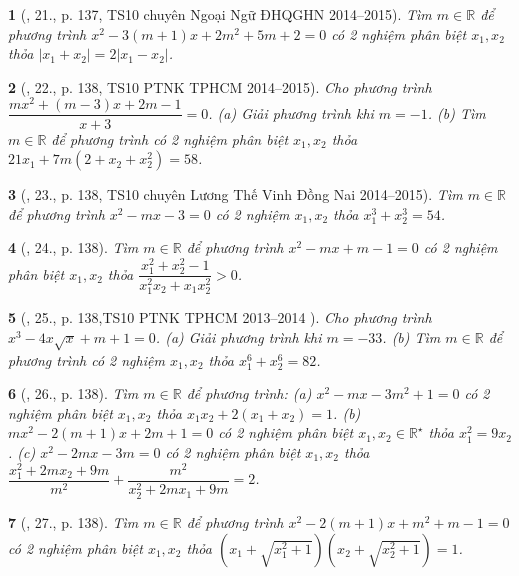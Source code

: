 \documentclass{article}
\newtheorem{baitoan}{}
\begin{document}
\begin{baitoan}[\cite{Thu_Viet_Minh_ptb2}, 21., p. 137, TS10 chuyên Ngoại Ngữ ĐHQGHN 2014--2015]
	Tìm $m\in\mathbb{R}$ để phương trình $x^2 - 3(m + 1)x + 2m^2 + 5m + 2 = 0$ có 2 nghiệm phân biệt $x_1,x_2$ thỏa $|x_1 + x_2| = 2|x_1 - x_2|$.
\end{baitoan}

\begin{baitoan}[\cite{Thu_Viet_Minh_ptb2}, 22., p. 138, TS10 PTNK TPHCM 2014--2015]
	Cho phương trình $\dfrac{mx^2 + (m - 3)x + 2m - 1}{x + 3} = 0$. (a) Giải phương trình khi $m = -1$. (b) Tìm $m\in\mathbb{R}$ để phương trình có 2 nghiệm phân biệt $x_1,x_2$ thỏa $21x_1 + 7m(2 + x_2 + x_2^2) = 58$.
\end{baitoan}

\begin{baitoan}[\cite{Thu_Viet_Minh_ptb2}, 23., p. 138, TS10 chuyên Lương Thế Vinh Đồng Nai 2014--2015]
	Tìm $m\in\mathbb{R}$ để phương trình $x^2 - mx - 3 = 0$ có 2 nghiệm $x_1,x_2$ thỏa $x_1^3 + x_2^3 = 54$.
\end{baitoan}

\begin{baitoan}[\cite{Thu_Viet_Minh_ptb2}, 24., p. 138]
	Tìm $m\in\mathbb{R}$ để phương trình $x^2 - mx + m - 1 = 0$ có 2 nghiệm phân biệt $x_1,x_2$ thỏa $\dfrac{x_1^2 + x_2^2 - 1}{x_1^2x_2 + x_1x_2^2} > 0$.
\end{baitoan}

\begin{baitoan}[\cite{Thu_Viet_Minh_ptb2}, 25., p. 138,TS10 PTNK TPHCM 2013--2014 ]
	Cho phương trình $x^3 - 4x\sqrt{x} + m + 1 = 0$. (a) Giải phương trình khi $m = -33$. (b) Tìm $m\in\mathbb{R}$ để phương trình có 2 nghiệm $x_1,x_2$ thỏa $x_1^6 + x_2^6 = 82$.
\end{baitoan}

\begin{baitoan}[\cite{Thu_Viet_Minh_ptb2}, 26., p. 138]
	Tìm $m\in\mathbb{R}$ để phương trình: (a) $x^2 - mx - 3m^2 + 1 = 0$ có 2 nghiệm phân biệt $x_1,x_2$ thỏa $x_1x_2 + 2(x_1 + x_2) = 1$. (b) $mx^2 - 2(m + 1)x + 2m + 1 = 0$ có 2 nghiệm phân biệt $x_1,x_2\in\mathbb{R}^\star$ thỏa $x_1^2 = 9x_2$. (c) $x^2 - 2mx - 3m = 0$ có 2 nghiệm phân biệt $x_1,x_2$ thỏa $\dfrac{x_1^2 + 2mx_2 + 9m}{m^2} + \dfrac{m^2}{x_2^2 + 2mx_1 + 9m} = 2$.
\end{baitoan}

\begin{baitoan}[\cite{Thu_Viet_Minh_ptb2}, 27., p. 138]
	Tìm $m\in\mathbb{R}$ để phương trình $x^2 - 2(m + 1)x + m^2 + m - 1 = 0$ có 2 nghiệm phân biệt $x_1,x_2$ thỏa $(x_1 + \sqrt{x_1^2 + 1})(x_2 + \sqrt{x_2^2 + 1}) = 1$.
\end{baitoan}
\end{document}
